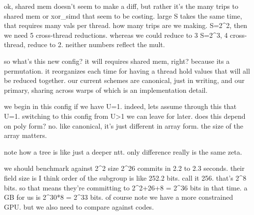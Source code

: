 ok, shared mem doesn't seem to make a diff, but rather it's the many trips to shared mem or xor_simd that seem to be costing. large S takes the same time, that requires many vals per thread.
how many trips are we making. 
S=2^2, then we need 5 cross-thread reductions. whereas we could reduce to 3
S=2^3, 4 cross-thread, reduce to 2.
neither numbers reflect the mult.

so what's this new config?
it will requires shared mem, right? because its a permutation.
it reorganizes each time for having a thread hold values that will all be reduced together.
our current schemes are canonical, just in writing, and our primary, sharing across warps of which is an implementation detail.

we begin in this config if we have U=1.
indeed, lets assume through this that U=1.
switching to this config from U>1 we can leave for later.
does this depend on poly form?
no. like canonical, it's just different in array form.
the size of the array matters. 


note how a tree is like just a deeper ntt. only difference really is the same zeta. 


we should benchmark against 2^2 size 2^26 commits in 2.2 to 2.3 seconds. their field size is 
I think order of the subgroup is like 252.2 bits. call it 256. that's 2^8 bits.
so that means they're committing to 2^{2+26+8} = 2^{36} bits in that time. a GB for us is 2^30*8 = 2^33 bits.
of course note we have a more constrained GPU. 
but we also need to compare against codes. 













